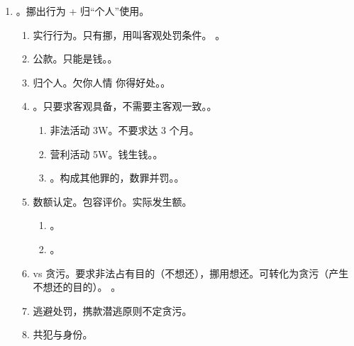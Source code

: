\begin{enumerate}
\begin{enumerate}
{                  因票据超期无法报销。
                  ，和私乙虚构劳务合同并虚开发票，找公司财物套取劳务费 5W。啥都不构成}。
        \end{enumerate}
  \item {}。挪出行为 + 归“个人”使用。
        \begin{enumerate}
          \item 实行行为。只有挪，用叫客观处罚条件。
                。
          \item 公款。只能是钱。。
          \item 归个人。欠你人情 \hz 你得好处。。
          \item {}。只要求客观具备，不需要主客观一致。。
                \begin{enumerate}
                  \item 非法活动 \yjt 3W。不要求达 3 个月。
                  \item 营利活动 \yjt 5W。钱生钱。。
                  \item {}。\sjt 构成其他罪的，数罪并罚。。
                \end{enumerate}
          \item 数额认定。\yi 包容评价。\er 实际发生额。
                \begin{enumerate}
                  \item {}。
                  \item {}。
                \end{enumerate}
          \item vs 贪污。要求非法占有目的（不想还），挪用想还。可转化为贪污（产生不想还的目的）。
                。
          \item 逃避处罚，携款潜逃原则不定贪污。
          \item 共犯与身份。

\end{enumerate}
\end{enumerate}
